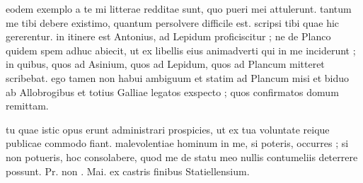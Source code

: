 


 eodem exemplo a te mi litterae redditae sunt, quo pueri mei attulerunt. tantum me tibi debere existimo, quantum persolvere difficile est. scripsi tibi quae hic gererentur. in itinere est Antonius, ad Lepidum proficiscitur ; ne de Planco quidem spem adhuc abiecit, ut ex libellis eius animadverti qui in me inciderunt ; in quibus, quos ad Asinium, quos ad Lepidum, quos ad Plancum mitteret scribebat. ego tamen non habui ambiguum et statim ad Plancum misi et biduo ab Allobrogibus et totius Galliae legatos exspecto ; quos confirmatos domum remittam.

 tu quae istic opus erunt administrari prospicies, ut ex tua voluntate reique publicae commodo fiant. malevolentiae hominum in me, si poteris, occurres ; si non potueris, hoc consolabere, quod me de statu meo nullis contumeliis deterrere possunt. Pr. non . Mai. ex castris finibus Statiellensium.
